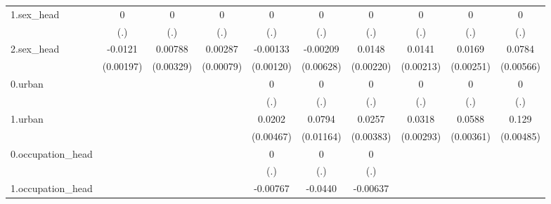 \begin{table}[htbp]
\begin{tabular}{l*{9}{c}}
1.sex\_head  &           0         &           0         &           0         &           0         &           0         &           0         &           0         &           0         &           0         \\
            &         (.)         &         (.)         &         (.)         &         (.)         &         (.)         &         (.)         &         (.)         &         (.)         &         (.)         \\
2.sex\_head  &     -0.0121\sym{***}&     0.00788\sym{**} &     0.00287\sym{***}&    -0.00133         &    -0.00209         &      0.0148\sym{***}&      0.0141\sym{***}&      0.0169\sym{***}&      0.0784\sym{***}\\
            &   (0.00197)         &   (0.00329)         &   (0.00079)         &   (0.00120)         &   (0.00628)         &   (0.00220)         &   (0.00213)         &   (0.00251)         &   (0.00566)         \\
0.urban     &                     &                     &                     &           0         &           0         &           0         &           0         &           0         &           0         \\
            &                     &                     &                     &         (.)         &         (.)         &         (.)         &         (.)         &         (.)         &         (.)         \\
1.urban     &                     &                     &                     &      0.0202\sym{***}&      0.0794\sym{***}&      0.0257\sym{***}&      0.0318\sym{***}&      0.0588\sym{***}&       0.129\sym{***}\\
            &                     &                     &                     &   (0.00467)         &   (0.01164)         &   (0.00383)         &   (0.00293)         &   (0.00361)         &   (0.00485)         \\
0.occupation\_head&                     &                     &                     &           0         &           0         &           0         &                     &                     &                     \\
            &                     &                     &                     &         (.)         &         (.)         &         (.)         &                     &                     &                     \\
1.occupation\_head&                     &                     &                     &    -0.00767\sym{*}  &     -0.0440\sym{**} &    -0.00637         &                     &                     &                     \\

\end{tabular}
\end{table}
